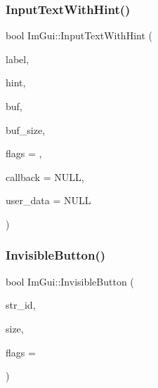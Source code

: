 \mbox{\label{namespaceImGui_aee5a5127f494966ad16e578714e8fac2}} 
\subsubsection{\texorpdfstring{Input\+Text\+With\+Hint()}{InputTextWithHint()}}
{\footnotesize\ttfamily bool Im\+Gui\+::\+Input\+Text\+With\+Hint (\begin{DoxyParamCaption}\item[{const char $\ast$}]{label,  }\item[{const char $\ast$}]{hint,  }\item[{char $\ast$}]{buf,  }\item[{size\+\_\+t}]{buf\+\_\+size,  }\item[{Im\+Gui\+Input\+Text\+Flags}]{flags = {},  }\item[{\hyperlink{imgui_8h_a484ebc32fe6c1e2d44ff601a0ca6b179}{Im\+Gui\+Input\+Text\+Callback}}]{callback = {\ttfamily NULL},  }\item[{\hyperlink{imgui__impl__opengl3__loader_8h_ac668e7cffd9e2e9cfee428b9b2f34fa7}{void} $\ast$}]{user\+\_\+data = {\ttfamily NULL} }\end{DoxyParamCaption})}

\mbox{\label{namespaceImGui_a1f61951b9d3a38083bd77b1dbe3ea895}} 
\subsubsection{\texorpdfstring{Invisible\+Button()}{InvisibleButton()}}
{\footnotesize\ttfamily bool Im\+Gui\+::\+Invisible\+Button (\begin{DoxyParamCaption}\item[{const char $\ast$}]{str\+\_\+id,  }\item[{const \hyperlink{structImVec2}{Im\+Vec2} \&}]{size,  }\item[{Im\+Gui\+Button\+Flags}]{flags = {} }\end{DoxyParamCaption})}

\mbox{\label{namespaceImGui_a89ade4bbfd411bef97d65b39ae7526a6}} 
